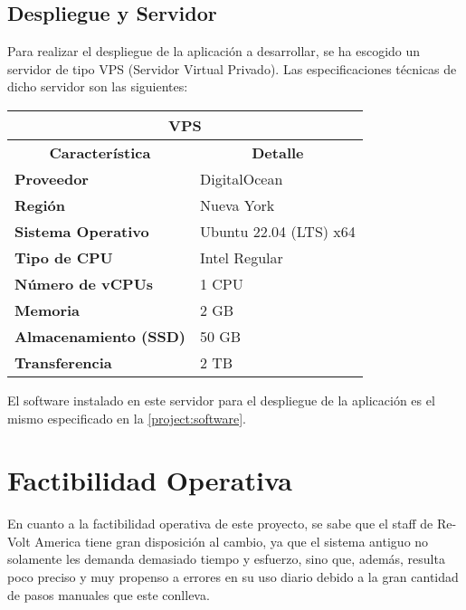 \subsection{Despliegue y Servidor}
Para realizar el despliegue de la aplicación a desarrollar, se ha escogido un servidor de tipo VPS (Servidor Virtual Privado). Las especificaciones técnicas de dicho servidor son las siguientes:

\begin{center}
	\begin{tabular}{ | l | p{10cm} |}
		\hline
		\multicolumn{2}{|c|}{\textbf{VPS}} \\
		\hline
		\multicolumn{1}{|c|}{\textbf{Característica}} & \multicolumn{1}{|c|}{\textbf{Detalle}} \\
		\hline
		
		{\textbf{Proveedor}} & DigitalOcean \\ \hline
		
		{\textbf{Región}} & Nueva York \\ \hline
		
		{\textbf{Sistema Operativo}} & Ubuntu 22.04 (LTS) x64 \\ \hline
		
		{\textbf{Tipo de CPU}} & Intel Regular \\ \hline
		
		{\textbf{Número de vCPUs}} & 1 CPU\\ \hline
		
		{\textbf{Memoria}} & 2 GB \\ \hline
		
		{\textbf{Almacenamiento (SSD)}} & 50 GB \\ \hline
		
		{\textbf{Transferencia}} & 2 TB \\ \hline
	\end{tabular}
  
  \label{table:vps}
\end{center}

El software instalado en este servidor para el despliegue de la aplicación es el mismo especificado en la \autoref{project:software}.

\section{Factibilidad Operativa}
En cuanto a la factibilidad operativa de este proyecto, se sabe que el staff de Re-Volt America tiene gran disposición al cambio, ya que el sistema antiguo no solamente les demanda demasiado tiempo y esfuerzo, sino que, además, resulta poco preciso y muy propenso a errores en su uso diario debido a la gran cantidad de pasos manuales que este conlleva.

